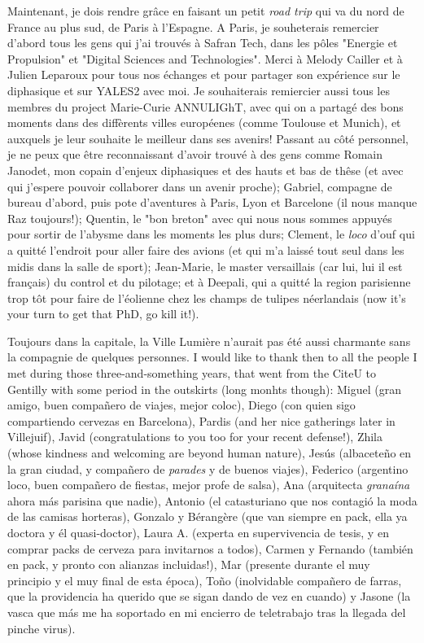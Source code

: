 Maintenant, je dois rendre grâce en faisant un petit \textsl{road trip} qui va du nord de France au plus sud, de Paris à l'Espagne. A Paris, je souheterais remercier d'abord tous les gens qui j'ai trouvés à Safran Tech, dans les pôles "Energie et Propulsion" et "Digital Sciences and Technologies". Merci à Melody Cailler et à Julien Leparoux pour tous nos échanges et pour partager son expérience sur le diphasique et sur YALES2 avec moi. Je souhaiterais remiercier aussi tous les membres du project Marie-Curie ANNULIGhT, avec qui on a partagé des bons moments dans des diffèrents villes européenes (comme Toulouse et Munich), et auxquels je leur souhaite le meilleur dans ses avenirs! Passant au côté personnel, je ne peux que être reconnaissant d'avoir trouvé à des gens comme Romain Janodet, mon copain d'enjeux diphasiques et des hauts et bas de thêse (et avec qui j'espere pouvoir collaborer dans un avenir proche); Gabriel, compagne de bureau d'abord, puis pote d'aventures à Paris, Lyon et Barcelone (il nous manque Raz toujours!); Quentin, le "bon breton" avec qui nous nous sommes appuyés pour sortir de l'abysme dans les moments les plus durs; Clement, le \textsl{loco} d'ouf qui a quitté l'endroit pour aller faire des avions (et qui m'a laissé tout seul dans les midis dans la salle de sport); Jean-Marie, le master versaillais (car lui, lui il est français) du control et du pilotage; et à Deepali, qui a quitté la region parisienne trop tôt pour faire de l'éolienne chez les champs de tulipes néerlandais (now it's your turn to get that PhD, go kill it!).
  
Toujours dans la capitale, la Ville Lumière n'aurait pas été aussi charmante sans la compagnie de quelques personnes. I would like to thank then to all the people I met during those three-and-something years, that went from the CiteU to Gentilly with some period in the outskirts (long monhts though): Miguel (gran amigo, buen compañero de viajes, mejor coloc), Diego (con quien sigo compartiendo cervezas en Barcelona), Pardis (and her nice gatherings later in Villejuif), Javid (congratulations to you too for your recent defense!), Zhila (whose kindness and welcoming are beyond human nature), Jesús (albaceteño en la gran ciudad, y compañero de \textsl{parades} y de buenos viajes), Federico (argentino loco, buen compañero de fiestas, mejor profe de salsa), Ana (arquitecta \textsl{granaína} ahora más parisina que nadie), Antonio (el catasturiano que nos contagió la moda de las camisas horteras), Gonzalo y Bérangère (que van siempre en pack, ella ya doctora y él quasi-doctor), Laura A. (experta en supervivencia de tesis, y en comprar packs de cerveza para invitarnos a todos), Carmen y Fernando (también en pack, y pronto con alianzas incluidas!), Mar (presente durante el muy principio y el muy final de esta época), Toño (inolvidable compañero de farras, que la providencia ha querido que se sigan dando de vez en cuando) y Jasone (la vasca que más me ha soportado en mi encierro de teletrabajo tras la llegada del pinche virus).

